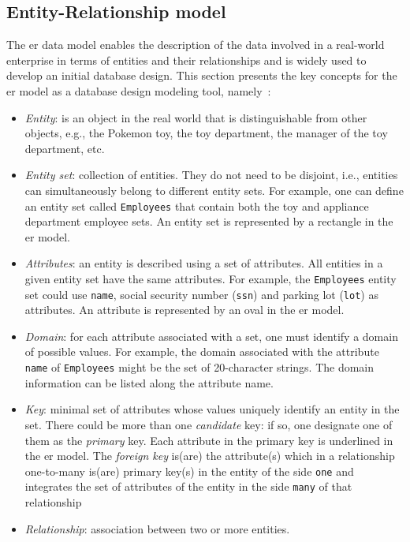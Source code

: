 \subsection{Entity-Relationship model}%
\label{sec:entity-relat-model}
%
The \acrfull{er} data model enables the description of the data involved in a
real-world enterprise in terms of entities and their relationships and is widely
used to develop an initial database design. This section presents the
key concepts for the \gls{er} model as a database design modeling tool, namely~\cite{ramakrishnan2003database}:
\begin{itemize}
\item \emph{Entity}: is an object in the real world that is distinguishable from
  other objects, e.g., the Pokemon toy, the toy department, the manager of the
  toy department, etc.
\item \emph{Entity set}: collection of entities. They do not need to be
  disjoint, i.e., entities can simultaneously belong to different entity
  sets. For example, one can define an entity set called \texttt{Employees} that
  contain both the toy and appliance department employee sets.
  An entity set is represented by a rectangle in the \gls{er} model.
\item \emph{Attributes}: an entity is described using a set of attributes. All
  entities in a given entity set have the same attributes. For example, the
  \texttt{Employees} entity set could use \texttt{name}, social security number
  (\texttt{ssn}) and parking lot (\texttt{lot}) as attributes.
  An attribute is represented by an oval in the \gls{er} model.
\item \emph{Domain}: for each attribute associated with a set, one must identify
  a domain of possible values. For example, the domain associated with the
  attribute \texttt{name} of \texttt{Employees} might be the set of 20-character
  strings.
  The domain information can be listed along the attribute name.
\item \emph{Key}: minimal set of attributes whose values uniquely identify an
  entity in the set. There could be more than one \emph{candidate} key: if so,
  one designate one of them as the \emph{primary} key.
  Each attribute in the primary key is underlined in the \gls{er} model. The
  \emph{foreign key} is(are) the
  attribute(s) which in a relationship one-to-many is(are) primary key(s) in the
  entity of the side \texttt{one} and integrates the set of attributes of the
  entity in the side \texttt{many} of that relationship
\item \emph{Relationship}: association between two or more entities.

\end{itemize}
